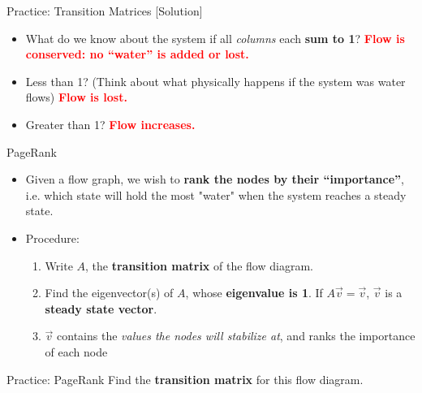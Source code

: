 \begin{frame}{Practice: Transition Matrices [Solution]}
    \begin{itemize}
        \item What do we know about the system if all \textit{columns} each \textbf{sum to 1}? \textcolor{red}{\textbf{Flow is conserved: no “water” is added or lost.
        }}
        \item Less than 1? (Think about what physically happens if the system was water flows) \textcolor{red}{\textbf{Flow is lost.}}
        \item Greater than 1? \textcolor{red}{\textbf{Flow increases.}}
    \end{itemize}
\end{frame}

\begin{frame}{PageRank}
    \begin{itemize}
        \item Given a flow graph, we wish to \textbf{rank the nodes by their “importance”}, i.e. which state will hold the most "water" when the system reaches a steady state.
        \item Procedure:
        \begin{enumerate}
            \item Write $A$, the \textbf{transition matrix} of the flow diagram.
            \item Find the eigenvector(s) of $A$, whose \textbf{eigenvalue is 1}.
            If $A\vec{v} = \vec{v}$, $\vec{v}$ is a \textbf{steady state vector}.
            \item $\vec{v}$ contains the \textit{values the nodes will stabilize at}, and ranks the importance of each node            
        \end{enumerate}
    \end{itemize}
\end{frame}

\begin{frame}{Practice: PageRank}
    Find the \textbf{transition matrix} for this flow diagram.
    \begin{center}
    \end{center}
\end{frame}

